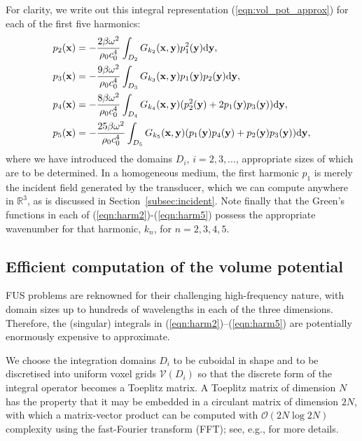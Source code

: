\documentclass[11pt]{article}
\numberwithin{equation}{section}
\newcommand{\sd}{\mbox{d}}
\newcommand{\bx}{\mathbf{x}}
\newcommand{\by}{\mathbf{y}}
\newcommand{\red}[1]{{\color{black} #1}}
\begin{document}
For clarity, we write out this integral representation (\ref{eqn:vol_pot_approx})
for each of the first five harmonics:
\begin{align}
    \label{eqn:harm2} p_2(\bx) &= -\frac{2\beta \omega^2}{\rho_0 c_0^4}
                    \int_{D_2}G_{k_2}(\bx,\by)p_1^2(\by)\sd \by, \\
        \label{eqn:harm3} p_3(\bx) &= -\frac{9\beta \omega^2}{\rho_0 c_0^4}
                    \int_{D_3}G_{k_3}(\bx,\by)p_1(\by) \red{p_2(\by)}\sd \by, \\
        \label{eqn:harm4} p_4(\bx) &= -\frac{8\beta \omega^2}{\rho_0 c_0^4}
        \int_{D_4}G_{k_4}(\bx,\by)(p_2^2(\by) 
                                  + 2p_1(\by)p_3(\by))\sd \by, \\
        \label{eqn:harm5} p_5(\bx) &= -\frac{25\beta \omega^2}{\rho_0 c_0^4}
        \int_{D_5}G_{k_5}(\bx,\by)(p_1(\by)p_4(\by) 
           + p_2(\by)p_3(\by))\sd \by, 
\end{align}
where we have introduced the domains $D_i$, $i=2,3,\ldots$, appropriate sizes 
of which are to be determined. In a homogeneous medium, the first harmonic $p_1$ 
is merely the incident field generated by the transducer, which we can compute 
anywhere in $\mathbb{R}^3$, \red{as is discussed in Section~\ref{subsec:incident}}. Note finally that the Green's functions in each of 
(\ref{eqn:harm2})-(\ref{eqn:harm5}) possess the appropriate wavenumber for that 
harmonic, $k_n$, for $n=2, 3, 4, 5$.


\subsection{Efficient computation of the volume potential}
\label{ss:compute_potential}
\red{FUS} problems are reknowned for their challenging high-frequency nature, with 
domain sizes up to hundreds of wavelengths in each of the three dimensions. 
Therefore, the (singular) integrals in (\ref{eqn:harm2})--(\ref{eqn:harm5}) are 
potentially enormously expensive to approximate. 

We choose the integration domains $D_i$ to be cuboidal in shape and to be 
discretised into uniform voxel grids 
$\mathcal{V}(D_i)$ so that the 
discrete form of the integral operator becomes a Toeplitz matrix. A Toeplitz 
matrix of dimension $N$ has the property that it may be embedded in a circulant 
matrix of dimension $2N$, with which a matrix-vector product can be computed 
with $\mathcal{O}(2N\log 2N)$ complexity using the fast-Fourier transform (FFT);
see, e.g., \cite{groth2020accelerating} for more details.
\end{document}
